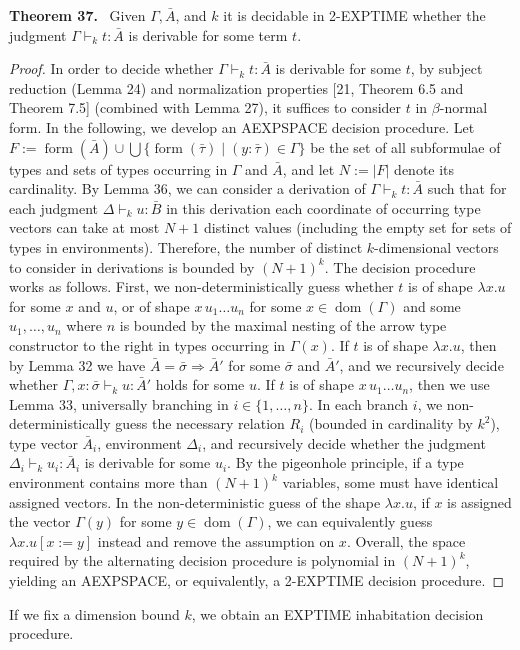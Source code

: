 \documentclass[10pt,a4paper]{article}
\newcommand{\Av}{\bar A}\newcommand{\Bv}{\bar B}\newcommand{\Cv}{\bar C}
\newcommand{\sv}{\bar\sigma}\newcommand{\tv}{\bar\tau}
\newcommand{\dom}{\operatorname{dom}}
\newcommand{\form}{\operatorname{form}}
\newcommand{\pmjudgment}[3]{#1\vdash_k #2:#3}
\newcommand{\orig}[2]{\par\medskip\noindent\textbf{#1 #2.}\ }
\begin{document}
\orig{Theorem}{37} Given $\Gamma,\Av$, and $k$ it is decidable in 2-EXPTIME whether the judgment $\pmjudgment\Gamma t\Av$ is derivable for some term $t$.

\begin{proof}
In order to decide whether $\pmjudgment\Gamma t\Av$ is derivable for some $t$, by subject reduction (Lemma 24) and normalization properties [21, Theorem 6.5 and Theorem 7.5] (combined with Lemma 27), it suffices to consider $t$ in $\beta$-normal form. In the following, we develop an AEXPSPACE decision procedure.
Let $F:=\form(\Av)\cup\bigcup\{\form(\tv)\mid(y:\tv)\in\Gamma\}$ be the set of all subformulae of types and sets of types occurring in $\Gamma$ and $\Av$, and let $N:=|F|$ denote its cardinality. By Lemma 36, we can consider a derivation of $\pmjudgment\Gamma t\Av$ such that for each judgment $\pmjudgment\Delta u\Bv$ in this derivation each coordinate of occurring type vectors can take at most $N+1$ distinct values (including the empty set for sets of types in environments). Therefore, the number of distinct $k$-dimensional vectors to consider in derivations is bounded by $(N+1)^k$.
The decision procedure works as follows. First, we non-deterministically guess whether $t$ is of shape $\lambda x.u$ for some $x$ and $u$, or of shape $x\,u_1\ldots u_n$ for some $x\in\dom(\Gamma)$ and some $u_1,\ldots,u_n$ where $n$ is bounded by the maximal nesting of the arrow type constructor to the right in types occurring in $\Gamma(x)$.
If $t$ is of shape $\lambda x.u$, then by Lemma 32 we have $\Av=\sv\Rightarrow\Av'$ for some $\sv$ and $\Av'$, and we recursively decide whether $\pmjudgment{\Gamma,x:\sv}u{\Av'}$ holds for some $u$.
If $t$ is of shape $x\,u_1\ldots u_n$, then we use Lemma 33, universally branching in $i\in\{1,\ldots,n\}$. In each branch $i$, we non-deterministically guess the necessary relation $R_i$ (bounded in cardinality by $k^2$), type vector $\Av_i$, environment $\Delta_i$, and recursively decide whether the judgment $\pmjudgment{\Delta_i}{u_i}{\Av_i}$ is derivable for some $u_i$.
By the pigeonhole principle, if a type environment contains more than $(N+1)^k$ variables, some must have identical assigned vectors. In the non-deterministic guess of the shape $\lambda x.u$, if $x$ is assigned the vector $\Gamma(y)$ for some $y\in\dom(\Gamma)$, we can equivalently guess $\lambda x.u[x:=y]$ instead and remove the assumption on $x$.
Overall, the space required by the alternating decision procedure is polynomial in $(N+1)^k$, yielding an AEXPSPACE, or equivalently, a 2-EXPTIME decision procedure.
\end{proof}
If we fix a dimension bound $k$, we obtain an EXPTIME inhabitation decision procedure.
\end{document}
